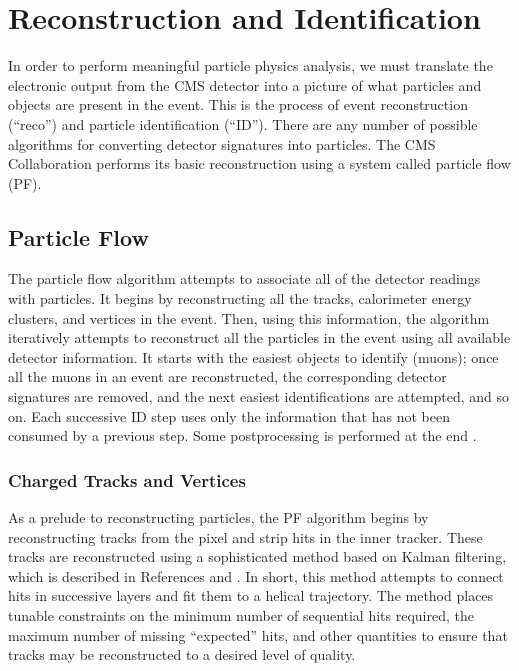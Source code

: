 \section{Reconstruction and Identification}
\label{sec:cms:recoandid}

In order to perform meaningful particle physics analysis, we must translate the
electronic output from the CMS detector into a picture of what particles and
objects are present in the event. This is the process of event
reconstruction (``reco'') and particle identification (``ID''). There
are any number of possible algorithms for converting detector
signatures into particles. The CMS Collaboration performs its basic
reconstruction using a system called particle flow (PF).

\subsection{Particle Flow}
\label{ssec:cms:reco:pf}

The particle flow algorithm attempts to associate all of the detector
readings with particles. It begins by
reconstructing all the tracks, calorimeter energy clusters, and
vertices in the event. Then, using this information, the algorithm
iteratively attempts to reconstruct all the particles
in the event using all available detector information. It
starts with the easiest objects to identify (muons); once all the
muons in an event are reconstructed, the corresponding detector
signatures are removed, and the next easiest identifications are
attempted, and so on. Each successive ID step uses only the
information that has not been consumed by a previous step. Some
postprocessing is performed at the end \cite{particleflow}.

\subsubsection{Charged Tracks and Vertices}
\label{sssec:cms:pf:trackvert}

As a prelude to reconstructing particles, the PF algorithm begins by
reconstructing tracks from the pixel and strip hits in the inner
tracker. These tracks are reconstructed using a sophisticated method
based on Kalman filtering, which is described in References
\cite{kalman1} and \cite{kalman2}. In short, this method attempts to
connect hits in successive layers and fit them to a helical
trajectory. The method places tunable constraints on the minimum
number of sequential hits required, the maximum number of missing
``expected'' hits, and other quantities to ensure that tracks may be
reconstructed to a desired level of quality.

